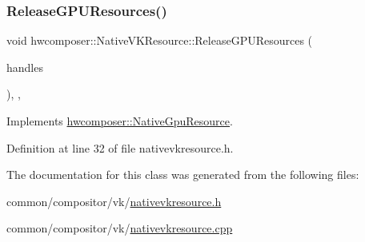 \subsubsection{\texorpdfstring{Release\+G\+P\+U\+Resources()}{ReleaseGPUResources()}}
{\footnotesize\ttfamily void hwcomposer\+::\+Native\+V\+K\+Resource\+::\+Release\+G\+P\+U\+Resources (\begin{DoxyParamCaption}\item[{const std\+::vector$<$ \mbox{\hyperlink{namespacehwcomposer_a963c5a1d5902d2d05710dba19af35b48}{Resource\+Handle}} $>$ \&}]{handles }\end{DoxyParamCaption})\hspace{0.3cm}{\ttfamily [inline]}, {\ttfamily [override]}, {\ttfamily [virtual]}}



Implements \mbox{\hyperlink{classhwcomposer_1_1NativeGpuResource_aeeedb37b304fcf7d005f6f409d88e0f5}{hwcomposer\+::\+Native\+Gpu\+Resource}}.



Definition at line 32 of file nativevkresource.\+h.


\begin{DoxyCode}{0}
\end{DoxyCode}


The documentation for this class was generated from the following files\+:\begin{DoxyCompactItemize}
\item 
common/compositor/vk/\mbox{\hyperlink{nativevkresource_8h}{nativevkresource.\+h}}\item 
common/compositor/vk/\mbox{\hyperlink{nativevkresource_8cpp}{nativevkresource.\+cpp}}\end{DoxyCompactItemize}
